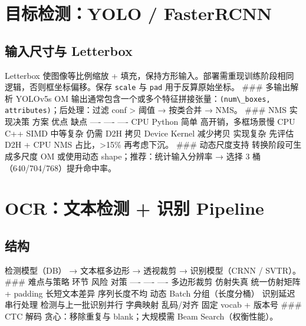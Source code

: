 \section{目标检测：YOLO /
FasterRCNN}\label{ux76eeux6807ux68c0ux6d4byolo-fasterrcnn}

\subsection{输入尺寸与
Letterbox}\label{ux8f93ux5165ux5c3aux5bf8ux4e0e-letterbox}

Letterbox 使图像等比例缩放 +
填充，保持方形输入。部署需重现训练阶段相同逻辑，否则框坐标偏移。保存
\passthrough{\lstinline!scale!} 与 \passthrough{\lstinline!pad!}
用于反算原始坐标。 \#\#\# 多输出解析 YOLOv5s OM
输出通常包含一个或多个特征拼接张量：\passthrough{\lstinline!(num\_boxes, attributes)!}；后处理：过滤
conf \textgreater{} 阈值 → 按类合并 → NMS。 \#\#\# NMS 实现决策
\textbar{} 方案 \textbar{} 优点 \textbar{} 缺点 \textbar{} \textbar{}
---- \textbar{} ---- \textbar{} ---- \textbar{} \textbar{} CPU Python
\textbar{} 简单 \textbar{} 高开销，多框场景慢 \textbar{} \textbar{} CPU
C++ SIMD \textbar{} 中等复杂 \textbar{} 仍需 D2H 拷贝 \textbar{}
\textbar{} Device Kernel \textbar{} 减少拷贝 \textbar{} 实现复杂
\textbar{} 先评估 D2H + CPU NMS 占比，\textgreater15\% 再考虑下沉。
\#\#\# 动态尺度支持 转换阶段可生成多尺度 OM 或使用动态
shape；推荐：统计输入分辨率 → 选择 3 桶（640/704/768）提升命中率。

\section{OCR：文本检测 + 识别
Pipeline}\label{ocrux6587ux672cux68c0ux6d4b-ux8bc6ux522b-pipeline}

\subsection{结构}\label{ux7ed3ux6784}

检测模型（DB） → 文本框多边形 → 透视裁剪 → 识别模型（CRNN / SVTR）。
\#\#\# 难点与策略 \textbar{} 环节 \textbar{} 风险 \textbar{} 对策
\textbar{} \textbar{} ---- \textbar{} ---- \textbar{} ---- \textbar{}
\textbar{} 多边形裁剪 \textbar{} 仿射失真 \textbar{} 统一仿射矩阵 +
padding \textbar{} \textbar{} 长短文本差异 \textbar{} 序列长度不均
\textbar{} 动态 Batch 分组（长度分桶） \textbar{} \textbar{} 识别延迟
\textbar{} 串行处理 \textbar{} 检测与上一批识别并行 \textbar{}
\textbar{} 字典映射 \textbar{} 乱码/对齐 \textbar{} 固定 vocab + 版本号
\textbar{} \#\#\# CTC 解码 贪心：移除重复与 blank；大规模需 Beam
Search（权衡性能）。

